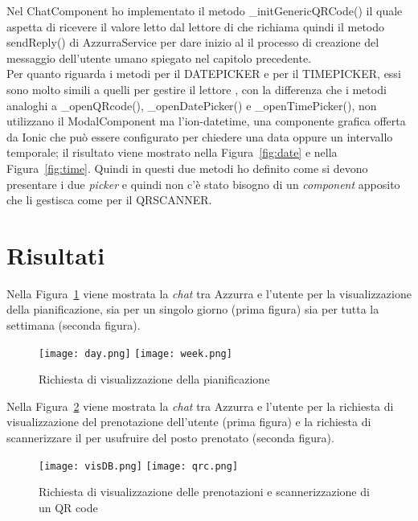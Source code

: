   Nel ChatComponent ho implementato il metodo \_initGenericQRCode() il quale aspetta di ricevere il valore letto dal lettore di  che richiama quindi il metodo sendReply() di AzzurraService per dare inizio al il processo di creazione del messaggio dell'utente umano spiegato nel capitolo precedente. \\
  
  Per quanto riguarda i metodi per il DATEPICKER e per il TIMEPICKER, essi sono molto simili a quelli per gestire il lettore , con la differenza che i metodi analoghi a \_openQRcode(), \_openDatePicker() e \_openTimePicker(), non utilizzano il ModalComponent ma l'ion-datetime, una componente grafica offerta da Ionic che può essere configurato per chiedere una data oppure un intervallo temporale; il risultato viene mostrato nella Figura~\ref{fig:date} e nella Figura~\ref{fig:time}. Quindi in questi due metodi ho definito come si devono presentare i due \emph{picker} e quindi non c'è stato bisogno di un \emph{component} apposito che li gestisca come per il QRSCANNER. 
\section{Risultati}

Nella Figura~\ref{fig:planning} viene mostrata la \emph{chat} tra Azzurra e l'utente per la visualizzazione della pianificazione, sia per un singolo giorno (prima figura) sia per tutta la settimana (seconda figura).\\

\begin{figure}[h]
	\begin{center}
		\texttt{[image: day.png]}\hfil
		\texttt{[image: week.png]}
		\caption{Richiesta di visualizzazione della pianificazione}\label{fig:planning}
	\end{center}
\end{figure}

Nella Figura~\ref{fig:QRc} viene mostrata la \emph{chat} tra Azzurra e l'utente per la richiesta di visualizzazione del prenotazione dell'utente (prima figura) e la richiesta di scannerizzare il  per usufruire del posto prenotato (seconda figura).\\

\begin{figure}[h]
	\begin{center}
		\texttt{[image: visDB.png]}\hfil
		\texttt{[image: qrc.png]}
		\caption{Richiesta di visualizzazione delle prenotazioni e scannerizzazione di un QR code}\label{fig:QRc}
	\end{center}
\end{figure}

